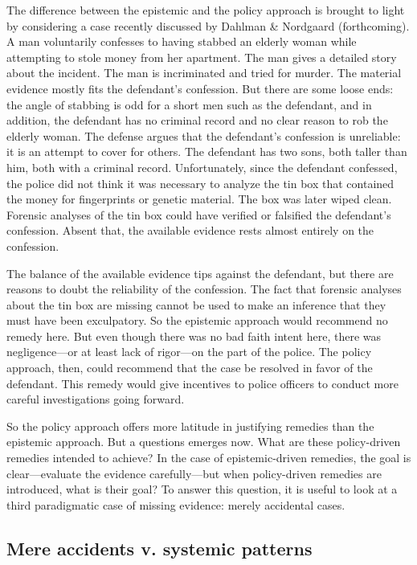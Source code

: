 \documentclass[
  10pt,
  dvipsnames,enabledeprecatedfontcommands]{scrartcl}
\begin{document}
The difference between the epistemic and the policy approach is brought
to light by considering a case recently discussed by Dahlman \&
Nordgaard (forthcoming). A man voluntarily confesses to having stabbed
an elderly woman while attempting to stole money from her apartment. The
man gives a detailed story about the incident. The man is incriminated
and tried for murder. The material evidence mostly fits the defendant's
confession. But there are some loose ends: the angle of stabbing is odd
for a short men such as the defendant, and in addition, the defendant
has no criminal record and no clear reason to rob the elderly woman. The
defense argues that the defendant's confession is unreliable: it is an
attempt to cover for others. The defendant has two sons, both taller
than him, both with a criminal record. Unfortunately, since the
defendant confessed, the police did not think it was necessary to
analyze the tin box that contained the money for fingerprints or genetic
material. The box was later wiped clean. Forensic analyses of the tin
box could have verified or falsified the defendant's confession. Absent
that, the available evidence rests almost entirely on the confession.

The balance of the available evidence tips against the defendant, but
there are reasons to doubt the reliability of the confession. The fact
that forensic analyses about the tin box are missing cannot be used to
make an inference that they must have been exculpatory. So the epistemic
approach would recommend no remedy here. But even though there was no
bad faith intent here, there was negligence---or at least lack of
rigor---on the part of the police. The policy approach, then, could
recommend that the case be resolved in favor of the defendant. This
remedy would give incentives to police officers to conduct more careful
investigations going forward.

So the policy approach offers more latitude in justifying remedies than
the epistemic approach. But a questions emerges now. What are these
policy-driven remedies intended to achieve? In the case of
epistemic-driven remedies, the goal is clear---evaluate the evidence
carefully---but when policy-driven remedies are introduced, what is
their goal? To answer this question, it is useful to look at a third
paradigmatic case of missing evidence: merely accidental cases.

\hypertarget{mere-accidents-v.-systemic-patterns}{%
\subsection{Mere accidents v. systemic
patterns}\label{mere-accidents-v.-systemic-patterns}}
\end{document}
